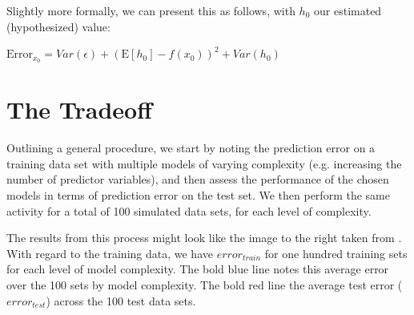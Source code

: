 \documentclass[english,nohyper,titlepage]{tufte-handout}\usepackage{knitr}
\begin{document}
Slightly more formally, we can present this as follows, with $h_0$ our estimated (hypothesized) value:

\vspace{.25cm}
\noindent $\text{Error}_{x_0} = Var(\epsilon) + (\text{E}[h_0] - f(x_0))^2 + Var(h_0) $
\vspace{.25cm}


\section{The Tradeoff}
Outlining a general procedure, we start by noting the prediction error on a training data set with multiple models of varying complexity (e.g. increasing the number of predictor variables), and then assess the performance of the chosen models in terms of prediction error on the test set.  We then perform the same activity for a total of 100 simulated data sets, for each level of complexity.

The results from this process might look like the image to the right taken from \citet{hastie_elements_2009}.  With regard to the training data, we have $error_{train}$ for one hundred training sets for each level of model complexity.  The bold blue line notes this average error over the 100 sets by model complexity.  The bold red line the average test error ($error_{test}$) across the 100 test data sets.
\end{document}
